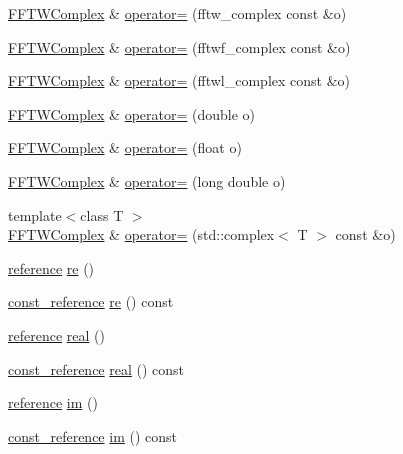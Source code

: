 \begin{DoxyCompactItemize}
\hyperlink{class_f_f_t_w_complex}{F\-F\-T\-W\-Complex} \& \hyperlink{class_f_f_t_w_complex_a844c682f6395c05b29cbb743d3929ad2}{operator=} (fftw\-\_\-complex const \&o)
\item 
\hyperlink{class_f_f_t_w_complex}{F\-F\-T\-W\-Complex} \& \hyperlink{class_f_f_t_w_complex_a201c7b01b881742ccecbde2ae71bc6ad}{operator=} (fftwf\-\_\-complex const \&o)
\item 
\hyperlink{class_f_f_t_w_complex}{F\-F\-T\-W\-Complex} \& \hyperlink{class_f_f_t_w_complex_a975c5f8deb6d3a5575caba3db4d950e2}{operator=} (fftwl\-\_\-complex const \&o)
\item 
\hyperlink{class_f_f_t_w_complex}{F\-F\-T\-W\-Complex} \& \hyperlink{class_f_f_t_w_complex_a17f8d38ff8a459a75d6632591d50ad6b}{operator=} (double o)
\item 
\hyperlink{class_f_f_t_w_complex}{F\-F\-T\-W\-Complex} \& \hyperlink{class_f_f_t_w_complex_a805b6c23e8ce82e575d7ac3d0a078b79}{operator=} (float o)
\item 
\hyperlink{class_f_f_t_w_complex}{F\-F\-T\-W\-Complex} \& \hyperlink{class_f_f_t_w_complex_afe180de845140af9350bba67fada8cb7}{operator=} (long double o)
\item 
{\footnotesize template$<$class T $>$ }\\\hyperlink{class_f_f_t_w_complex}{F\-F\-T\-W\-Complex} \& \hyperlink{class_f_f_t_w_complex_af8c8abe046f9ce0a9c7116b800636078}{operator=} (std\-::complex$<$ T $>$ const \&o)
\item 
\hyperlink{class_f_f_t_w_complex_a7dfe1fb0319193094de12aef4000957d}{reference} \hyperlink{class_f_f_t_w_complex_a2f2dc7efdf2028595282d65ac0d78b67}{re} ()
\item 
\hyperlink{class_f_f_t_w_complex_abf193fae52159474a60f7377e5c363e5}{const\-\_\-reference} \hyperlink{class_f_f_t_w_complex_a22589d9a73091ca1124714206e261ea3}{re} () const 
\item 
\hyperlink{class_f_f_t_w_complex_a7dfe1fb0319193094de12aef4000957d}{reference} \hyperlink{class_f_f_t_w_complex_a3990a666d9c90957eccde9ffa260cfac}{real} ()
\item 
\hyperlink{class_f_f_t_w_complex_abf193fae52159474a60f7377e5c363e5}{const\-\_\-reference} \hyperlink{class_f_f_t_w_complex_a5a7108ea76120c5a448bc9a69fcb6ba8}{real} () const 
\item 
\hyperlink{class_f_f_t_w_complex_a7dfe1fb0319193094de12aef4000957d}{reference} \hyperlink{class_f_f_t_w_complex_ac4b43ad04b92e0c8d737b339dfba0449}{im} ()
\item 
\hyperlink{class_f_f_t_w_complex_abf193fae52159474a60f7377e5c363e5}{const\-\_\-reference} \hyperlink{class_f_f_t_w_complex_acf94f0a06733ad9efb0605d0c771b75b}{im} () const 

\end{DoxyCompactItemize}
